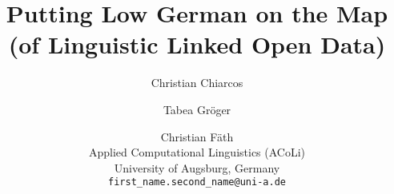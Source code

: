 \documentclass[11pt]{article}
\title{Putting Low German on the Map (of Linguistic Linked Open Data)}
\author{Christian Chiarcos \and Tabea Gröger \and Christian Fäth \\
  Applied Computational Linguistics (ACoLi)\\
  University of Augsburg, Germany \\
  \texttt{first\_name.second\_name@uni-a.de}
}
\begin{document}
\maketitle
\begin{abstract}

\end{abstract}











\end{document}
